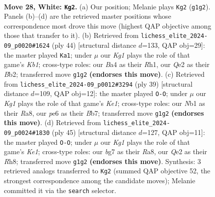 \documentclass[11pt]{article}
\begin{document}
\clearpage

\begin{figure}[p]\centering
\begin{subfigure}{0.46\textwidth}\centering
\resizebox{\linewidth}{!}{%
\newchessgame
\chessboard[
  setfen={rnbr4/pp3pbk/3qpnp1/P2p2Bp/B2P3P/6P1/RPPNQP2/1N2R1K1 w - - 9 28},
  showmover=false,
  pgfstyle=straightmove, color=movearrow, markmove={g1-g2}
]}
\caption{}
\end{subfigure}\hfill
\begin{subfigure}{0.46\textwidth}\centering
\resizebox{\linewidth}{!}{%
\newchessgame
\chessboard[
  setfen={1knr4/1pprb2b/p1n4q/3P2p1/N1P2p1p/1P1N1P2/PB2BQ1P/1K1R3R w - - 1 23},
  showmover=false,
  pgfstyle=straightmove, color=movearrow, markmove={b1-a1}
]}
\caption{}
\end{subfigure}
\\[4pt]
\begin{subfigure}{0.46\textwidth}\centering
\resizebox{\linewidth}{!}{%
\newchessgame
\chessboard[
  setfen={r1n1k2r/pb1p2pp/1q2p3/1Pp1Pp2/2P2P2/6K1/P2Q1NPP/R4B1R b kq - 2 20},
  showmover=false,
  pgfstyle=straightmove, color=movearrow, markmove={e8-g8}
]}
\caption{}
\end{subfigure}\hfill
\begin{subfigure}{0.46\textwidth}\centering
\resizebox{\linewidth}{!}{%
\newchessgame
\chessboard[
  setfen={r3k2r/5ppp/1qn1p1b1/np1pP3/p2P3Q/P4N1P/1P1B1PP1/R2B1RK1 b kq - 4 23},
  showmover=false,
  pgfstyle=straightmove, color=movearrow, markmove={e8-g8}
]}
\caption{}
\end{subfigure}
\caption{\textbf{Move 28, White: \texttt{Kg2}.} (a) Our position; Melanie plays \texttt{Kg2} (\texttt{g1g2}). Panels (b)--(d) are the retrieved master positions whose correspondence most drove this move (highest QAP objective among those that transfer to it). (b) Retrieved from \texttt{lichess\_elite\_2024-09\_p0020\#1624} (ply 44) [structural distance $d$=133, QAP obj=29]: the master played \texttt{Ka1}; under $\mu$ our \emph{Kg1} plays the role of that game's \emph{Kb1}; cross-type roles: our \emph{B}a4 as their \emph{R}h1, our \emph{Q}e2 as their \emph{B}b2; transferred move \texttt{g1g2} \textbf{(endorses this move)}. (c) Retrieved from \texttt{lichess\_elite\_2024-09\_p0012\#3294} (ply 39) [structural distance $d$=109, QAP obj=12]: the master played \texttt{O-O}; under $\mu$ our \emph{Kg1} plays the role of that game's \emph{Ke1}; cross-type roles: our \emph{N}b1 as their \emph{R}a8, our \emph{p}e6 as their \emph{B}b7; transferred move \texttt{g1g2} \textbf{(endorses this move)}. (d) Retrieved from \texttt{lichess\_elite\_2024-09\_p0024\#1830} (ply 45) [structural distance $d$=127, QAP obj=11]: the master played \texttt{O-O}; under $\mu$ our \emph{Kg1} plays the role of that game's \emph{Ke1}; cross-type roles: our \emph{b}g7 as their \emph{R}a8, our \emph{Q}e2 as their \emph{R}h8; transferred move \texttt{g1g2} \textbf{(endorses this move)}. Synthesis: 3 retrieved analogs transferred to \texttt{Kg2} (summed QAP objective 52, the strongest correspondence among the candidate moves); Melanie committed it via the \texttt{search} selector.}
\label{fig:thought-m54}
\end{figure}
\end{document}
